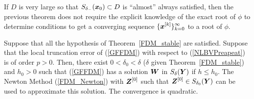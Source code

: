 If $D$ is very large so that $S_{\delta_-}(\bm{x}_0) \subset D$ is
``almost'' always satisfied, then the previous theorem does
not require the explicit knowledge of the exact root of $\phi$ to
determine conditions to get a converging sequence
$\displaystyle \{ \bm{x}^{[k]}\}_{k=0}^\infty$ to a root of $\phi$.

\begin{theorem}
Suppose that all the hypothesis of Theorem~\ref{FDM_stable} are
satisfied.  Suppose that the local truncation error of (\ref{GFFDM})
with respect to (\ref{NLBVPreapeat}) is of order $p>0$.  Then, there exist
$0 <\delta_0 < \delta$ ($\delta$ given Theorem~\ref{FDM_stable})
and $h_0 >0$ such that (\ref{GFFDM}) has a solution $\bm{W}$ in
$S_\delta(\bm{Y})$ if $h\leq h_0$.  The Newton Method
(\ref{FDM_Newton}) with $\displaystyle \bm{Z}^{[0]}$ such that
$\displaystyle \bm{Z}^{[0]} \in S_{\delta_0}(\bm{Y})$
can be used to approximate this solution.  The convergence is quadratic.
\end{theorem}

